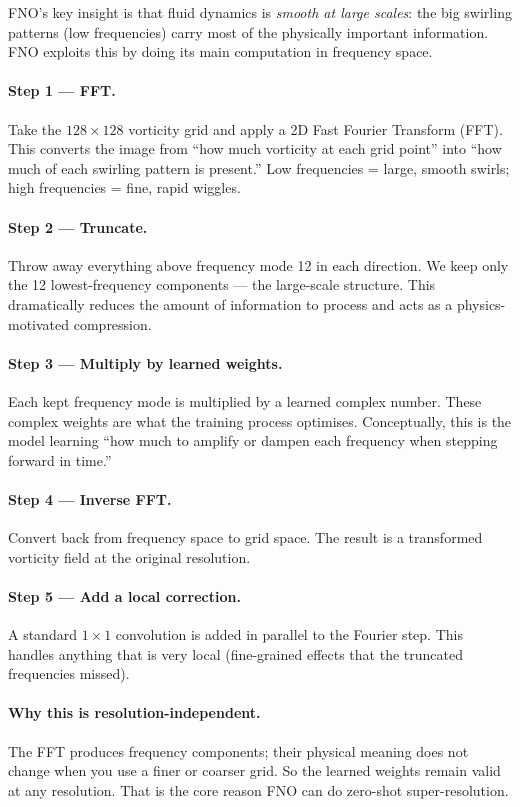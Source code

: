 \documentclass[11pt,twocolumn]{article}
\begin{document}
FNO's key insight is that fluid dynamics is \emph{smooth at large scales}:
the big swirling patterns (low frequencies) carry most of the physically
important information.
FNO exploits this by doing its main computation in frequency space.

\paragraph{Step 1 --- FFT.}
Take the $128 \times 128$ vorticity grid and apply a 2D Fast Fourier Transform
(FFT).
This converts the image from ``how much vorticity at each grid point''
into ``how much of each swirling pattern is present.''
Low frequencies = large, smooth swirls; high frequencies = fine, rapid wiggles.

\paragraph{Step 2 --- Truncate.}
Throw away everything above frequency mode 12 in each direction.
We keep only the 12 lowest-frequency components --- the large-scale structure.
This dramatically reduces the amount of information to process and acts as a
physics-motivated compression.

\paragraph{Step 3 --- Multiply by learned weights.}
Each kept frequency mode is multiplied by a learned complex number.
These complex weights are what the training process optimises.
Conceptually, this is the model learning ``how much to amplify or dampen each
frequency when stepping forward in time.''

\paragraph{Step 4 --- Inverse FFT.}
Convert back from frequency space to grid space.
The result is a transformed vorticity field at the original resolution.

\paragraph{Step 5 --- Add a local correction.}
A standard $1 \times 1$ convolution is added in parallel to the Fourier step.
This handles anything that is very local (fine-grained effects that the
truncated frequencies missed).

\paragraph{Why this is resolution-independent.}
The FFT produces frequency components; their physical meaning does not change
when you use a finer or coarser grid.
So the learned weights remain valid at any resolution.
That is the core reason FNO can do zero-shot super-resolution.
\end{document}
